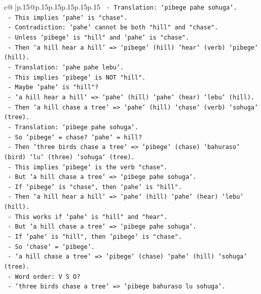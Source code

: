 \documentclass{article}
\begin{document}
{\begin{supertabular}{c@{$\;$}|p{.15\linewidth}@{}p{.15\linewidth}p{.15\linewidth}p{.15\linewidth}p{.15\linewidth}p{.15\linewidth}}
{{{\texttt{       {-} Translation: `pibege pahe sohuga`.} \\
\texttt{       {-} This implies `pahe` is "chase".} \\
\texttt{       {-} Contradiction: `pahe` cannot be both "hill" and "chase".} \\
\texttt{       {-} Unless `pibege` is "hill" and `pahe` is "chase".} \\
\texttt{       {-} Then `a hill hear a hill` => `pibege` (hill) `hear` (verb) `pibege` (hill).} \\
\texttt{       {-} Translation: `pahe pahe lebu`.} \\
\texttt{       {-} This implies `pibege` is NOT "hill".} \\
\texttt{       {-} Maybe `pahe` is "hill"?} \\
\texttt{       {-} `a hill hear a hill` => `pahe` (hill) `pahe` (hear) `lebu` (hill).} \\
\texttt{       {-} Then `a hill chase a tree` => `pahe` (hill) `chase` (verb) `sohuga` (tree).} \\
\texttt{       {-} Translation: `pibege pahe sohuga`.} \\
\texttt{       {-} So `pibege` = chase? `pahe` = hill?} \\
\texttt{       {-} Then `three birds chase a tree` => `pibege` (chase) `bahuraso` (bird) `lu` (three) `sohuga` (tree).} \\
\texttt{       {-} This implies `pibege` is the verb "chase".} \\
\texttt{       {-} But `a hill chase a tree` => `pibege pahe sohuga`.} \\
\texttt{       {-} If `pibege` is "chase", then `pahe` is "hill".} \\
\texttt{       {-} Then `a hill hear a hill` => `pahe` (hill) `pahe` (hear) `lebu` (hill).} \\
\texttt{       {-} This works if `pahe` is "hill" and "hear".} \\
\texttt{       {-} But `a hill chase a tree` => `pibege pahe sohuga`.} \\
\texttt{       {-} If `pahe` is "hill", then `pibege` is "chase".} \\
\texttt{       {-} So `chase` = `pibege`.} \\
\texttt{       {-} `a hill chase a tree` => `pibege` (chase) `pahe` (hill) `sohuga` (tree).} \\
\texttt{       {-} Word order: V S O?} \\
\texttt{       {-} `three birds chase a tree` => `pibege bahuraso lu sohuga`.} \\
}}}
\end{supertabular}}
\end{document}
